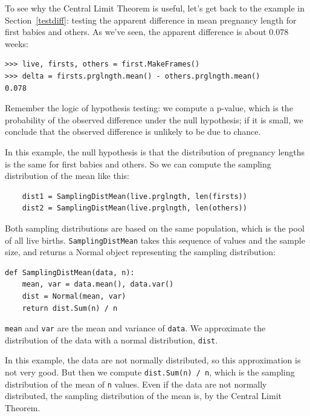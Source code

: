 \documentclass[12pt]{book}
\theoremstyle{exercise}
\begin{document}
To see why the Central Limit Theorem is useful, let's get back
to the example in Section~\ref{testdiff}: testing the apparent
difference in mean pregnancy length for first babies and others.
As we've seen, the apparent difference is about
0.078 weeks:%
%
%

\begin{verbatim}
>>> live, firsts, others = first.MakeFrames()
>>> delta = firsts.prglngth.mean() - others.prglngth.mean()
0.078
\end{verbatim}

Remember the logic of hypothesis testing: we compute a p-value, which
is the probability of the observed difference under the null
hypothesis; if it is small, we conclude that the observed difference
is unlikely to be due to chance.%
%
%

In this example, the null hypothesis is that the distribution of
pregnancy lengths is the same for first babies and others.  
So we can compute the sampling distribution of the mean
like this:%

\begin{verbatim}
    dist1 = SamplingDistMean(live.prglngth, len(firsts))
    dist2 = SamplingDistMean(live.prglngth, len(others))
\end{verbatim}

Both sampling distributions are based on the same population, which is
the pool of all live births.  {\tt SamplingDistMean} takes this
sequence of values and the sample size, and returns a Normal object
representing the sampling distribution:

\begin{verbatim}
def SamplingDistMean(data, n):
    mean, var = data.mean(), data.var()
    dist = Normal(mean, var)
    return dist.Sum(n) / n
\end{verbatim}

{\tt mean} and {\tt var} are the mean and variance of
{\tt data}.  We approximate the distribution of the data with
a normal distribution, {\tt dist}.  

In this example, the data are not normally distributed, so this
approximation is not very good.  But then we compute {\tt dist.Sum(n)
  / n}, which is the sampling distribution of the mean of {\tt n}
values.  Even if the data are not normally distributed, the sampling
distribution of the mean is, by the Central Limit Theorem.%
%
\end{document}
